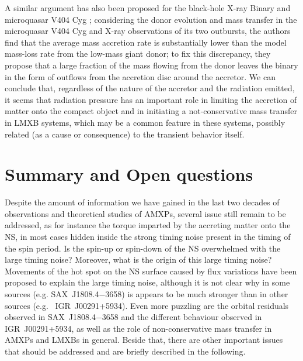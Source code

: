 \documentclass[graybox]{svmult}
\def \saxj{{\rm SAX~J1808.4$-$3658\xspace}}
\begin{document}
A similar argument has also been proposed for the black-hole X-ray Binary and microquasar V404 Cyg  \cite{Ziolkowski2018}; considering the donor evolution and mass transfer in the microquasar V404 Cyg and X-ray observations of its two outbursts, the authors find that the average mass accretion rate is substantially lower than the model mass-loss rate from the low-mass giant donor; to fix this discrepancy, they propose that a large fraction of the mass flowing from the donor leaves the binary in the form of outflows from the accretion disc around the accretor.   
%
We can conclude that, regardless of the nature of the accretor and the radiation emitted, it seems that radiation pressure has an important role in limiting the accretion of matter onto the compact object and in initiating a not-conservative mass transfer in LMXB systems, which may be a common feature in these systems, possibly related (as a cause or consequence) to the transient behavior itself. 


\section{Summary and Open questions}
Despite the amount of information we have gained in the last two decades of observations and theoretical studies of AMXPs, several issue still remain to be addressed, as for instance the torque imparted by the accreting matter onto the NS, in most cases hidden inside the strong timing noise present in the timing of the spin period. Is the spin-up or spin-down of the NS overwhelmed with the large timing noise? Moreover, what is the origin of this large timing noise? Movements of the hot spot on the NS surface caused by flux variations have been proposed to explain the large timing noise, although it is not clear why in some sources (e.g. \saxj{}) is appears to be much stronger than in other sources (e.g. \ IGR~J00291+5934). Even more puzzling are the orbital residuals observed in \saxj{} and the different behaviour observed in IGR~J00291+5934, as well as the role of non-conservative mass transfer in AMXPs and LMXBs in general. Beside that, there are other important issues that should be addressed and are briefly described in the following. 
\end{document}
